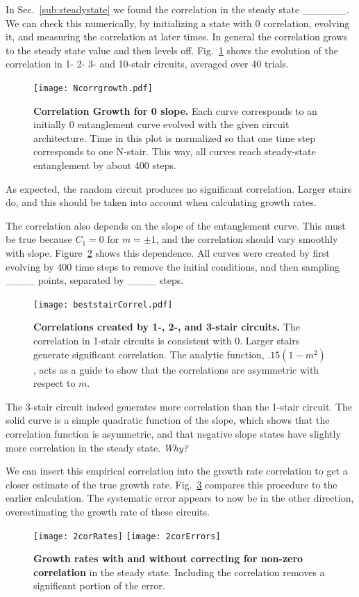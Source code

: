 In Sec.~\ref{sub:steadystate} we found the correlation in the steady state \_\_\_\_\_\_. We can check this numerically, by initializing a state with 0 correlation, evolving it, and measuring the correlation at later times. In general the correlation grows to the steady state value and then levels off. Fig.~\ref{fig:corrgrowth} shows the evolution of the correlation in 1- 2- 3- and 10-stair circuits, averaged over 40 trials.
\begin{figure}
	\centering
	\texttt{[image: Ncorrgrowth.pdf]}
	\caption{\textbf{Correlation Growth for 0 slope.} Each curve corresponds to an initially 0 entanglement curve evolved with the given circuit architecture. Time in this plot is normalized so that one time step corresponds to one N-stair. This way, all curves reach steady-state entanglement by about 400 steps.
	}
	\label{fig:corrgrowth}
\end{figure}
As expected, the random circuit produces no significant correlation. Larger stairs do, and this should be taken into account when calculating growth rates. 

The correlation also depends on the slope of the entanglement curve. This must be true because $C_1=0$ for $m=\pm1$, and the correlation should vary smoothly with slope. Figure~\ref{fig:steadystate} shows this dependence. All curves were created by first evolving by 400 time steps to remove the initial conditions, and then sampling \_\_\_\_ points, separated by \_\_\_\_ steps.
\begin{figure}
	\centering
	\texttt{[image: beststairCorrel.pdf]}
	\caption{\textbf{Correlations created by 1-, 2-, and 3-stair circuits.} The correlation in 1-stair circuits is consistent with 0. Larger stairs generate significant correlation. The analytic function, $.15(1-m^2)$, acts as a guide to show that the correlations are asymmetric with respect to $m$.}
	\label{fig:steadystate}
\end{figure}

The 3-stair circuit indeed generates more correlation than the 1-stair circuit. The solid curve is a simple quadratic function of the slope, which shows that the correlation function is asymmetric, and that negative slope states have slightly more correlation in the steady state. \emph{Why?}

We can insert this empirical correlation into the growth rate correlation to get a closer estimate of the true growth rate. Fig.~\ref{fig:2corRates} compares this procedure to the earlier calculation. The systematic error appears to now be in the other direction, overestimating the growth rate of these circuits.
\begin{figure}
	\centering
	\texttt{[image: 2corRates]}
	\texttt{[image: 2corErrors]}
	\caption{\textbf{Growth rates with and without correcting for non-zero correlation} in the steady state. Including the correlation removes a significant portion of the error.}
	\label{fig:2corRates}
\end{figure}

